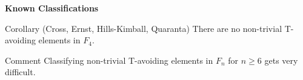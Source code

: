 \documentclass{beamer}
\newcommand\heapblock[4]{\fill[fill=#4, fill opacity=0.35, draw=#4, line width=1.1pt, rounded corners,shift={(\xxaxis:#1)},shift={(\yyaxis:#2)}] (-1,-1) rectangle (1,1);\node at (#1,#2) {\footnotesize $#3$};}
\newcommand\xxaxis{0}
\newcommand\yyaxis{90}
\begin{document}
\begin{frame}{\textbf{Known Classifications}}

\begin{block}{Corollary (Cross, Ernst, Hills-Kimball, Quaranta)}
There are no non-trivial T-avoiding elements in $F_4$.	
\end{block}
\pause

\begin{block}{Comment}
Classifying non-trivial T-avoiding elements in $F_n$ for $n \geq 6$ gets very difficult.	
\end{block}

\vspace{-1em}

\begin{figure}\centering
{}
\end{figure}


\end{frame}




%
%
\end{document}
